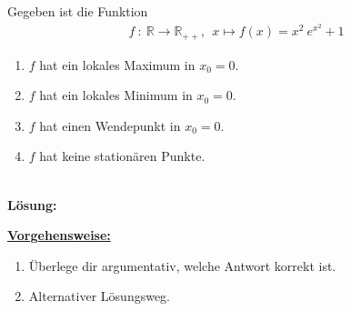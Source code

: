 \renewcommand{\labelenumi}{(\alph{enumi})}
Gegeben ist die Funktion
\begin{align*}
f \ : \ \mathbb{R} \to \mathbb{R}_{++}, \ \ 
x \mapsto f(x) = x^2 \ e^{x^2} + 1
\end{align*}
\begin{enumerate}
	\item 
	$ f $ hat ein lokales Maximum in $ x_0 = 0 $.
	\item
	$ f $ hat ein lokales Minimum in $ x_0 = 0 $.
	\item
	$ f $ hat einen Wendepunkt in $ x_0 = 0 $.
	\item
	$ f $ hat keine stationären Punkte.
\end{enumerate}
\ \\
\textbf{Lösung:}
\begin{mdframed}
\underline{\textbf{Vorgehensweise:}}
\renewcommand{\labelenumi}{\theenumi.}
\begin{enumerate}
\item Überlege dir argumentativ, welche Antwort korrekt ist.
\item Alternativer Lösungsweg. 
\end{enumerate}
\end{mdframed}

